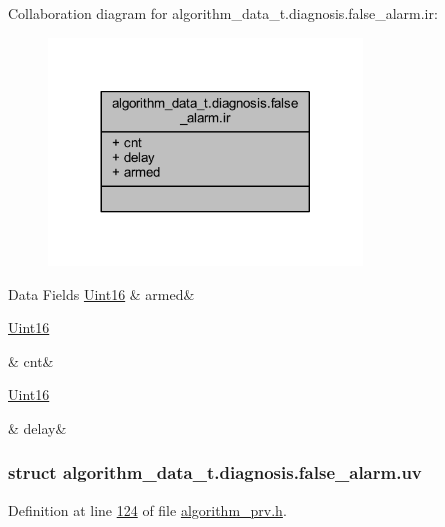 Collaboration diagram for algorithm\+\_\+data\+\_\+t.\+diagnosis.\+false\+\_\+alarm.\+ir\+:\nopagebreak
\begin{figure}[H]
\begin{center}
\leavevmode
\includegraphics[width=236pt]{d3/d8a/a00899}
\end{center}
\end{figure}
\begin{DoxyFields}{Data Fields}
\hypertarget{a00016_a6e0c631e86ef2402cfa1ca3608a5123e}{\hyperlink{a00072_a59a9f6be4562c327cbfb4f7e8e18f08b}{Uint16}}\label{a00016_a6e0c631e86ef2402cfa1ca3608a5123e}
&
armed&
\\
\hline

\hypertarget{a00016_a2817f701d5e1a1181e657251363295fd}{\hyperlink{a00072_a59a9f6be4562c327cbfb4f7e8e18f08b}{Uint16}}\label{a00016_a2817f701d5e1a1181e657251363295fd}
&
cnt&
\\
\hline

\hypertarget{a00016_a7243f8be75253afbadf7477867021f8b}{\hyperlink{a00072_a59a9f6be4562c327cbfb4f7e8e18f08b}{Uint16}}\label{a00016_a7243f8be75253afbadf7477867021f8b}
&
delay&
\\
\hline

\end{DoxyFields}
\label{d9/dcc/a00102}
\hypertarget{a00016_d9/dcc/a00102}{}
\subsubsection{struct algorithm\+\_\+data\+\_\+t.\+diagnosis.\+false\+\_\+alarm.\+uv}


Definition at line \hyperlink{a00016_source_l00124}{124} of file \hyperlink{a00016_source}{algorithm\+\_\+prv.\+h}.



